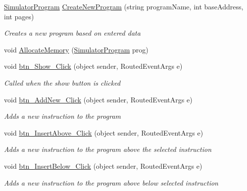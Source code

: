 \begin{DoxyCompactItemize}
\hyperlink{class_c_p_u___o_s___simulator_1_1_c_p_u_1_1_simulator_program}{Simulator\+Program} \hyperlink{class_c_p_u___o_s___simulator_1_1_main_window_aa735efa9bc97df2ceb545fdce5f351df}{Create\+New\+Program} (string program\+Name, int base\+Address, int pages)
\begin{DoxyCompactList}\small\item\em Creates a new program based on entered data \end{DoxyCompactList}\item 
void \hyperlink{class_c_p_u___o_s___simulator_1_1_main_window_a36996a77a281fa859327ed7038789aa2}{Allocate\+Memory} (\hyperlink{class_c_p_u___o_s___simulator_1_1_c_p_u_1_1_simulator_program}{Simulator\+Program} prog)
\item 
void \hyperlink{class_c_p_u___o_s___simulator_1_1_main_window_afcb6e2b3719374f56fd8cb1c786bb219}{btn\+\_\+\+Show\+\_\+\+Click} (object sender, Routed\+Event\+Args e)
\begin{DoxyCompactList}\small\item\em Called when the show button is clicked \end{DoxyCompactList}\item 
void \hyperlink{class_c_p_u___o_s___simulator_1_1_main_window_a37c97ac2869b40063089f1af9cd86724}{btn\+\_\+\+Add\+New\+\_\+\+Click} (object sender, Routed\+Event\+Args e)
\begin{DoxyCompactList}\small\item\em Adds a new instruction to the program \end{DoxyCompactList}\item 
void \hyperlink{class_c_p_u___o_s___simulator_1_1_main_window_a8f710b1bee7b3c9360fb5652231b0502}{btn\+\_\+\+Insert\+Above\+\_\+\+Click} (object sender, Routed\+Event\+Args e)
\begin{DoxyCompactList}\small\item\em Adds a new instruction to the program above the selected instruction \end{DoxyCompactList}\item 
void \hyperlink{class_c_p_u___o_s___simulator_1_1_main_window_ac2307db4caedc82b5a6201077fb1c5b7}{btn\+\_\+\+Insert\+Below\+\_\+\+Click} (object sender, Routed\+Event\+Args e)
\begin{DoxyCompactList}\small\item\em Adds a new instruction to the program above below selected instruction \end{DoxyCompactList}\item 

\end{DoxyCompactItemize}
